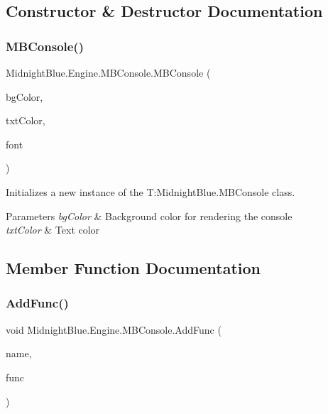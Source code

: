 \subsection{Constructor \& Destructor Documentation}
\hypertarget{class_midnight_blue_1_1_engine_1_1_m_b_console_ae4761c55bdd60ce3a49e6bb06b7c53af}{}\label{class_midnight_blue_1_1_engine_1_1_m_b_console_ae4761c55bdd60ce3a49e6bb06b7c53af} 
\subsubsection{\texorpdfstring{M\+B\+Console()}{MBConsole()}}
{\footnotesize\ttfamily Midnight\+Blue.\+Engine.\+M\+B\+Console.\+M\+B\+Console (\begin{DoxyParamCaption}\item[{Color}]{bg\+Color,  }\item[{Color}]{txt\+Color,  }\item[{Sprite\+Font}]{font }\end{DoxyParamCaption})\hspace{0.3cm}{\ttfamily [inline]}}



Initializes a new instance of the T\+:\+Midnight\+Blue.\+M\+B\+Console class. 


\begin{DoxyParams}{Parameters}
{\em bg\+Color} & Background color for rendering the console\\
\hline
{\em txt\+Color} & Text color\\
\hline
\end{DoxyParams}


\subsection{Member Function Documentation}
\hypertarget{class_midnight_blue_1_1_engine_1_1_m_b_console_a5438a91f83cf6082a20e8d2c417e6ce1}{}\label{class_midnight_blue_1_1_engine_1_1_m_b_console_a5438a91f83cf6082a20e8d2c417e6ce1} 
\subsubsection{\texorpdfstring{Add\+Func()}{AddFunc()}}
{\footnotesize\ttfamily void Midnight\+Blue.\+Engine.\+M\+B\+Console.\+Add\+Func (\begin{DoxyParamCaption}\item[{string}]{name,  }\item[{Action$<$ string\mbox{[}$\,$\mbox{]}$>$}]{func }\end{DoxyParamCaption})\hspace{0.3cm}{\ttfamily [inline]}}



